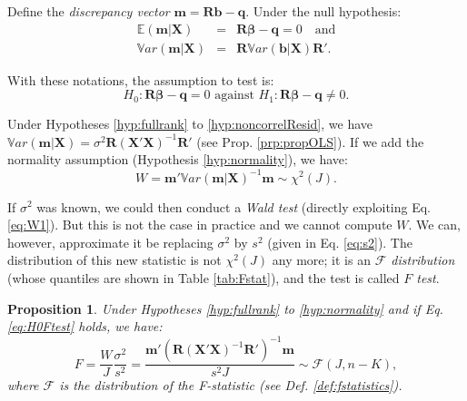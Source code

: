 \documentclass[
  12pt,
]{book}
\newtheorem{proposition}{Proposition}[chapter]
\theoremstyle{definition}
\theoremstyle{definition}
\theoremstyle{definition}
\theoremstyle{definition}
\theoremstyle{remark}
\begin{document}
Define the \emph{discrepancy vector} \(\mathbf{m} = \mathbf{R}\mathbf{b} - \mathbf{q}\). Under the null hypothesis:
\begin{eqnarray*}
\mathbb{E}(\mathbf{m}|\mathbf{X}) &=& \mathbf{R}\boldsymbol\beta - \mathbf{q} = 0 \quad \mbox{and} \\
\mathbb{V}ar(\mathbf{m}|\mathbf{X}) &=& \mathbf{R} \mathbb{V}ar(\mathbf{b}|\mathbf{X}) \mathbf{R}'.
\end{eqnarray*}

With these notations, the assumption to test is:
\begin{equation}
\boxed{H_0: \mathbf{R}\boldsymbol\beta - \mathbf{q} = 0 \mbox{ against } H_1: \mathbf{R}\boldsymbol\beta - \mathbf{q} \ne 0.}\label{eq:H0Ftest}
\end{equation}

Under Hypotheses \ref{hyp:fullrank} to \ref{hyp:noncorrelResid}, we have \(\mathbb{V}ar(\mathbf{m}|\mathbf{X}) = \sigma^2 \mathbf{R} (\mathbf{X}'\mathbf{X})^{-1} \mathbf{R}'\) (see Prop. \ref{prp:propOLS}). If we add the normality assumption (Hypothesis \ref{hyp:normality}), we have:
\begin{equation}
W = \mathbf{m}'\mathbb{V}ar(\mathbf{m}|\mathbf{X})^{-1}\mathbf{m} \sim \chi^2(J). \label{eq:W1}
\end{equation}

If \(\sigma^2\) was known, we could then conduct a \emph{Wald test} (directly exploiting Eq. \eqref{eq:W1}). But this is not the case in practice and we cannot compute \(W\). We can, however, approximate it be replacing \(\sigma^2\) by \(s^2\) (given in Eq. \eqref{eq:s2}). The distribution of this new statistic is not \(\chi^2(J)\) any more; it is an \emph{\(\mathcal{F}\) distribution} (whose quantiles are shown in Table \ref{tab:Fstat}), and the test is called \emph{\(F\) test}.

\begin{proposition}
\protect\hypertarget{prp:Ftest1}{}\label{prp:Ftest1}Under Hypotheses \ref{hyp:fullrank} to \ref{hyp:normality} and if Eq. \eqref{eq:H0Ftest} holds, we have:
\begin{equation}
F = \frac{W}{J}\frac{\sigma^2}{s^2} = \frac{\mathbf{m}'(\mathbf{R}(\mathbf{X}'\mathbf{X})^{-1}\mathbf{R}')^{-1}\mathbf{m}}{s^2J} \sim \mathcal{F}(J,n-K),\label{eq:defFstatistics}
\end{equation}
where \(\mathcal{F}\) is the distribution of the F-statistic (see Def. \ref{def:fstatistics}).
\end{proposition}
\end{document}
